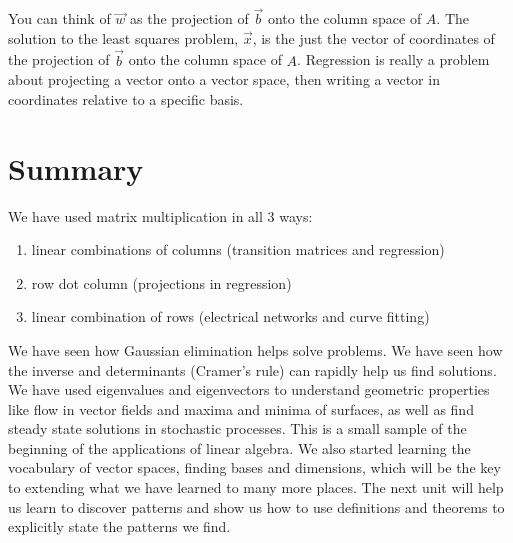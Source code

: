 \begin{example}
You can think of $\vec w$ as the projection of $\vec b$ onto the column space of $A$.  The solution to the least squares problem, $\vec x$, is the just the vector of coordinates of the projection of $\vec b$ onto the column space of $A$.
Regression is really a problem about projecting a vector onto a vector space, then writing a vector in coordinates relative to a specific basis.


     
      

\end{example}


\section{Summary}
We have used matrix multiplication in all 3 ways:
\begin{enumerate}
\item linear combinations of columns (transition matrices and regression)
\item row dot column (projections in regression)
\item linear combination of rows (electrical networks and curve fitting)
\end{enumerate}
We have seen how Gaussian elimination helps solve problems.  We have seen how the inverse and determinants (Cramer's rule) can rapidly help us find solutions.  We have used eigenvalues and eigenvectors to understand geometric properties like flow in vector fields and maxima and minima of surfaces, as well as find steady state solutions in stochastic processes.  This is a small sample of the beginning of the applications of linear algebra. We also started learning the vocabulary of vector spaces, finding bases and dimensions, which will be the key to extending what we have learned to many more places.  The next unit will help us learn to discover patterns and show us how to use definitions and theorems to explicitly state the patterns we find.  


